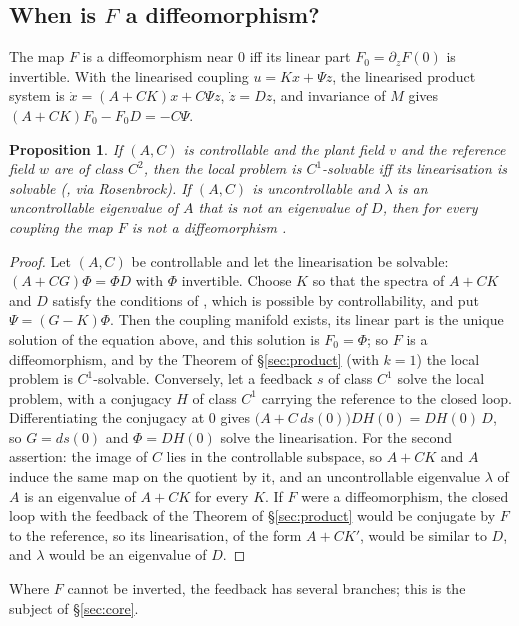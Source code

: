 \documentclass[11pt,reqno]{amsart}
\theoremstyle{plain}
\newtheorem*{proposition}{Proposition}
\theoremstyle{definition}
\theoremstyle{remark}
\begin{document}
\subsection{When is $F$ a diffeomorphism?}\label{sec:graph}
The map $F$ is a diffeomorphism near $0$ iff its linear part $F_0=\partial_zF(0)$ is invertible. With the
linearised coupling $u=Kx+\Psi z$, the linearised product system is $\dot x=(A+CK)x+C\Psi z$, $\dot z=Dz$, and
invariance of $M$ gives $(A+CK)F_0-F_0D=-C\Psi$.
\begin{proposition}\label{cor:border}
If $(A,C)$ is controllable and the plant field $v$ and the reference field $w$ are of class $C^{2}$, then the
local problem is $C^{1}$-solvable iff its linearisation is solvable \textup{(}\cite[Thm.~2.5]{Shosh1990}, via Rosenbrock\textup{)}.
If $(A,C)$ is uncontrollable and $\lambda$ is an uncontrollable eigenvalue of $A$ that is not an eigenvalue
of $D$, then for every coupling the map $F$ is not a diffeomorphism \cite[Cor.~2.7]{Shosh1990}.
\end{proposition}
\begin{proof}Let $(A,C)$ be controllable and let the linearisation be solvable: $(A+CG)\Phi=\Phi D$
with $\Phi$ invertible. Choose $K$ so that the spectra of $A+CK$ and $D$ satisfy the conditions of
\cite[Thm.~1.2]{Shosh1990}, which is possible by controllability, and put $\Psi=(G-K)\Phi$. Then the coupling
manifold exists, its linear part is the unique solution of the equation above, and this solution is
$F_0=\Phi$; so $F$ is a diffeomorphism, and by the Theorem of \S\ref{sec:product} (with $k=1$) the local
problem is $C^{1}$-solvable. Conversely, let a feedback $s$ of class $C^{1}$ solve the local problem, with a
conjugacy $H$ of class $C^{1}$ carrying the reference to the closed loop. Differentiating the conjugacy at $0$
gives $\bigl(A+C\,ds(0)\bigr)DH(0)=DH(0)\,D$, so $G=ds(0)$ and $\Phi=DH(0)$ solve the linearisation.
For the second assertion: the image of $C$ lies in the controllable subspace, so $A+CK$ and $A$ induce the same
map on the quotient by it, and an uncontrollable eigenvalue $\lambda$ of $A$ is an eigenvalue of $A+CK$ for
every $K$. If $F$ were a diffeomorphism, the closed loop with the feedback of the Theorem of
\S\ref{sec:product} would be conjugate by $F$ to the reference, so its linearisation, of the form $A+CK'$,
would be similar to $D$, and $\lambda$ would be an eigenvalue of $D$.
\end{proof}

Where $F$ cannot be inverted, the feedback has several branches; this is the subject of \S\ref{sec:core}.
\end{document}
